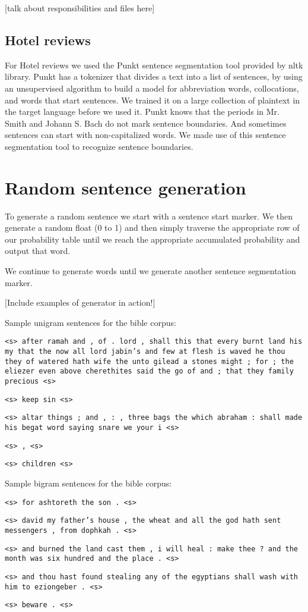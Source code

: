 \documentclass{article}
\begin{document}
[talk about responsibilities and files here]

\subsection{Hotel reviews}
For Hotel reviews we used the Punkt sentence segmentation tool provided by nltk library. Punkt has a tokenizer that divides a text into a list of sentences, by using an unsupervised algorithm to build a model for abbreviation words, collocations, and words that start sentences. We trained it on a large collection of plaintext in the target language before we used it. Punkt knows that the periods in Mr. Smith and Johann S. Bach do not mark sentence boundaries. And sometimes sentences can start with non-capitalized words. We made use of this sentence segmentation tool to recognize sentence boundaries. 

\section{Random sentence generation}
To generate a random sentence we start with a sentence start marker. We then generate a random float (0 to 1)
and then simply traverse the appropriate row of our probability table until we reach the appropriate accumulated probability and output that word.\par

We continue to generate words until we generate another sentence segmentation marker.

[Include examples of generator in action!]

\iffalse
\vspace{2mm}
\setlength{\parindent}{0cm}
\newcommand\npar{\par\smallskip}
Sample unigram sentences for the bible corpus:\npar
\texttt{<s> after ramah and , of . lord , shall this that every burnt land his my that the now all lord jabin's and few at flesh is waved he thou they of watered hath wife the unto gilead a stones might ; for ; the eliezer even above cherethites said the go of and ; that they family precious <s>}\npar
\texttt{<s> keep sin <s>}\npar
\texttt{<s> altar things ; and , : , three bags the which abraham : shall made his begat word saying snare we your i <s>}\npar
\texttt{<s> , <s>}\npar
\texttt{<s> children <s>}\npar
\bigskip

Sample bigram sentences for the bible corpus:\npar
\texttt{<s> for ashtoreth the son . <s>}\npar
\texttt{<s> david my father's house , the wheat and all the god hath sent messengers , from dophkah . <s>}\npar
\texttt{<s> and burned the land cast them , i will heal : make thee ? and the month was six hundred and the place . <s>}\npar
\texttt{<s> and thou hast found stealing any of the egyptians shall wash with him to eziongeber . <s>}\npar
\texttt{<s> beware . <s>}\npar
\bigskip
\end{document}
